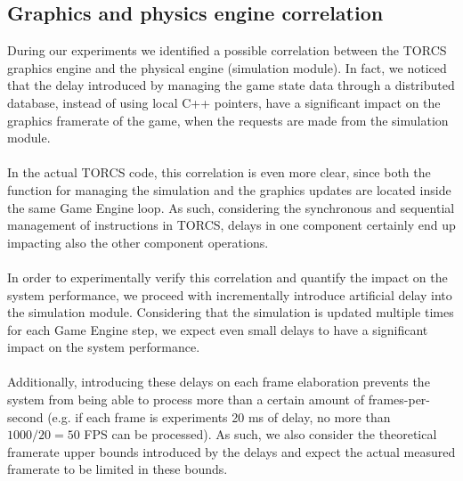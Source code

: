 \subsection{Graphics and physics engine correlation}
During our experiments we identified a possible correlation between the TORCS graphics engine and the physical engine (simulation module). In fact, we noticed that the delay introduced by managing the game state data through a distributed database, instead of using local C++ pointers, have a significant impact on the graphics framerate of the game, when the requests are made from the simulation module. \\ \\
In the actual TORCS code, this correlation is even more clear, since both the function for managing the simulation and the graphics updates are located inside the same Game Engine loop. As such, considering the synchronous and sequential management of instructions in TORCS, delays in one component certainly end up impacting also the other component operations. \\ \\
In order to experimentally verify this correlation and quantify the impact on the system performance, we proceed with incrementally introduce artificial delay into the simulation module. Considering that the simulation is updated multiple times for each Game Engine step, we expect even small delays to have a significant impact on the system performance. \\ \\
Additionally, introducing these delays on each frame elaboration prevents the system from being able to process more than a certain amount of frames-per-second (e.g. if each frame is experiments 20 ms of delay, no more than $1000/20=50$ FPS can be processed). As such, we also consider the theoretical framerate upper bounds introduced by the delays and expect the actual measured framerate to be limited in these bounds.

